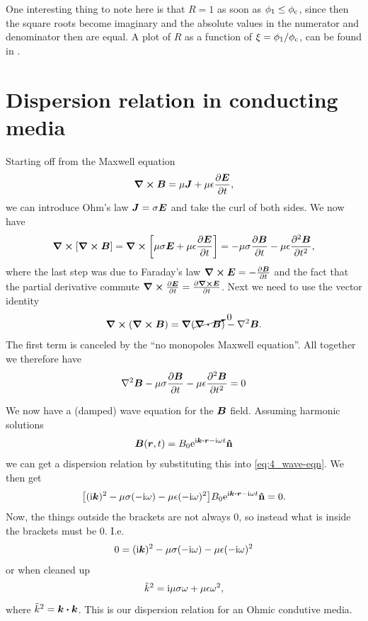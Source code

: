 \documentclass[11pt,letter, swedish, english
]{article}
\begin{document}
One interesting thing to note here is that $R=1$ as soon as
$\phi_1\le\phi_\text{c}$, since then the square roots become imaginary and the
absolute values in the numerator and denominator then are equal. 
A plot of $R$ as a function of $\xi=\phi_1/\phi_\text{c}$, can be found in
. 




\section{Dispersion relation in conducting media}
Starting off from the Maxwell equation
\begin{equation}
\curl\vb*B = \mu\vb*J + \mu\epsilon\pdv{\vb*E}{t},
\end{equation}
we can introduce Ohm's law $\vb*J=\sigma\vb*E$ and take the curl of
both sides. We now have
\begin{equation}\label{eq:4_wave-eqn}
\curl[\curl\vb*B] = 
\curl\qty[\mu\sigma\vb*E + \mu\epsilon\pdv{\vb*E}{t}]
=-\mu\sigma\pdv{\vb*B}{t} - \mu\epsilon\pdv[2]{\vb*B}{t},
\end{equation}
where the last step was due to Faraday's law 
$\curl\vb*E = -\pdv{\vb*B}{t}$ and the fact that the partial
derivative commute $\curl\pdv{\vb*E}{t} = \pdv{\curl\vb*E}{t}$. 
Next we need to use the vector identity
\begin{equation}
\curl(\curl\vb*B) = \grad{}(\cancelto{0}{\div\vb*B}) - \laplacian\vb*B.
\end{equation}
The first term is canceled by the ``no monopoles Maxwell
equation''. All together we therefore have
\begin{equation}\label{eq:4_wave-eqn}
\laplacian\vb*B
-\mu\sigma\pdv{\vb*B}{t} - \mu\epsilon\pdv[2]{\vb*B}{t} =0
\end{equation}

We now have a (damped) wave equation for the $\vb*B$ field. Assuming
harmonic solutions
\begin{equation}
\vb*B(\vb*r, t) = B_0\ee^{\ii\vb*k\vdot\vb*r - \ii\omega t}\vu{n}
\end{equation}
we can get a dispersion relation by substituting this into
\eqref{eq:4_wave-eqn}. We then get
\begin{equation}
\qty[(\ii\vb*k)^2
-\mu\sigma(-\ii\omega) - \mu\epsilon(-\ii\omega)^2
]B_0\ee^{\ii\vb*k\vdot\vb*r - \ii\omega t}\vu{n} =0.
\end{equation}
Now, the things outside the brackets are not always 0, so instead what
is inside the brackets must be 0. I.e.
\begin{equation}
0=(\mathrm{i}\vb*k)^2
-\mu\sigma(-\mathrm{i}\omega) - \mu\epsilon(-\mathrm{i}\omega)^2
\end{equation}
or when cleaned up
\begin{equation}\label{eq:4_disp}
\tilde{k}^2 = \mathrm{i}\mu\sigma\omega +\mu\epsilon\omega^2,
\end{equation}
where $\kt^2 = \vb*k\vdot\vb*k$.
This is our dispersion relation for an Ohmic condutive media. 
\end{document}
